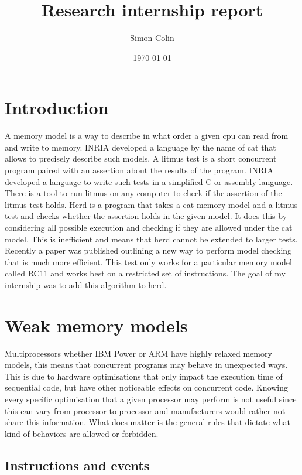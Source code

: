 \documentclass[a4,11pt]{article}
\title{Research internship report}
\author{Simon Colin}
\date{\today}
\begin{document}
\maketitle


\section{Introduction}
A memory model is a way to describe in what order a given cpu can read from and write to memory. INRIA developed a language by the name of cat that allows to precisely describe such models.
A litmus test is a short concurrent program paired with an assertion about the results of the program. INRIA developed a language to write such tests in a simplified C or assembly language. There is a tool to run litmus on any computer to check if the assertion of the litmus test holds.
Herd is a program that takes a cat memory model and a litmus test and checks whether the assertion holds in the given model. It does this by considering all possible execution and checking if they are allowed under the cat model. This is inefficient and means that herd cannot be extended to larger tests.
Recently a paper was published outlining a new way to perform model checking that is much more efficient. This test only works for a particular memory model called RC11 and works best on a restricted set of instructions. The goal of my internship was to add this algorithm to herd.

\section{Weak memory models}

Multiprocessors whether IBM Power or ARM have highly relaxed memory models, this means that concurrent programs may behave in unexpected ways. This is due to hardware optimisations that only impact the execution time of sequential code, but have other noticeable effects on concurrent code. Knowing every specific optimisation that a given processor may perform is not useful since this can vary from processor to processor and manufacturers would rather not share this information. What does matter is the general rules that dictate what kind of behaviors are allowed or forbidden.

\subsection{Instructions and events}
\end{document}
